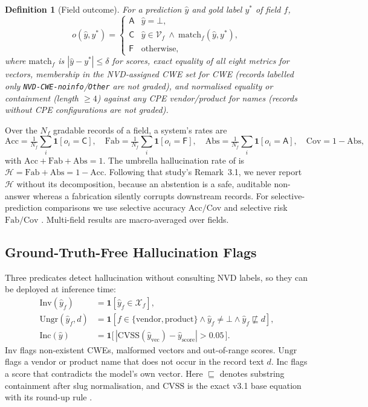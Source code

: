 \documentclass[11pt]{article}
\newtheorem{definition}{Definition}[section]
\newcommand{\Fab}{\mathrm{Fab}}\newcommand{\Acc}{\mathrm{Acc}}\newcommand{\Abs}{\mathrm{Abs}}
\newcommand{\Cov}{\mathrm{Cov}}
\begin{document}
\begin{definition}[Field outcome]\label{def:outcome}
For a prediction $\hat y$ and gold label $y^*$ of field $f$,
\begin{equation}\label{eq:outcome}
o(\hat y,y^*)=\begin{cases}
\mathsf{A} & \hat y=\bot,\\
\mathsf{C} & \hat y\in\mathcal{V}_f\ \wedge\ \mathrm{match}_f(\hat y,y^*),\\
\mathsf{F} & \text{otherwise,}
\end{cases}
\end{equation}
where $\mathrm{match}_f$ is $|\hat y-y^*|\le\delta$ for scores, exact equality of all eight metrics for vectors, membership in the NVD-assigned CWE set for CWE (records labelled only \texttt{NVD-CWE-noinfo}/\texttt{Other} are not graded), and normalised equality or containment (length $\ge 4$) against any CPE vendor/product for names (records without CPE configurations are not graded).
\end{definition}

Over the $N_f$ gradable records of a field, a system's rates are
\begin{equation}\label{eq:rates}
\Acc=\tfrac{1}{N_f}\textstyle\sum_i \mathbf{1}[o_i{=}\mathsf{C}],\quad
\Fab=\tfrac{1}{N_f}\sum_i \mathbf{1}[o_i{=}\mathsf{F}],\quad
\Abs=\tfrac{1}{N_f}\sum_i \mathbf{1}[o_i{=}\mathsf{A}],\quad
\Cov=1-\Abs,
\end{equation}
with $\Acc+\Fab+\Abs=1$. The umbrella hallucination rate of \citet{anon2026grounding} is $\mathcal{H}=\Fab+\Abs=1-\Acc$. Following that study's Remark~3.1, we never report $\mathcal{H}$ without its decomposition, because an abstention is a safe, auditable non-answer whereas a fabrication silently corrupts downstream records. For selective-prediction comparisons we use selective accuracy $\Acc/\Cov$ and selective risk $\Fab/\Cov$ \citep{geifman2017selective}. Multi-field results are macro-averaged over fields.

\subsection{Ground-Truth-Free Hallucination Flags}
Three predicates detect hallucination without consulting NVD labels, so they can be deployed at inference time:
\begin{align}
\mathrm{Inv}(\hat y_f) &= \mathbf{1}[\hat y_f\in\mathcal{X}_f], \label{eq:inv}\\
\mathrm{Ungr}(\hat y_f,d) &= \mathbf{1}[f\in\{\text{vendor},\text{product}\}\wedge \hat y_f\neq\bot\wedge \hat y_f\not\sqsubseteq d], \label{eq:ungr}\\
\mathrm{Inc}(\hat y) &= \mathbf{1}\big[\,|\mathrm{CVSS}(\hat y_{\text{vec}})-\hat y_{\text{score}}|>0.05\,\big]. \label{eq:inc}
\end{align}
$\mathrm{Inv}$ flags non-existent CWEs, malformed vectors and out-of-range scores. $\mathrm{Ungr}$ flags a vendor or product name that does not occur in the record text $d$. $\mathrm{Inc}$ flags a score that contradicts the model's own vector.
Here $\sqsubseteq$ denotes substring containment after slug normalisation, and $\mathrm{CVSS}$ is the exact v3.1 base equation with its round-up rule \citep{first2019cvss}.
\end{document}
